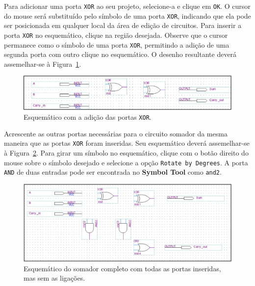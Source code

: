 \documentclass[12pt,a4paper]{article}
\begin{document}
Para adicionar uma porta \texttt{XOR} ao seu projeto, selecione-a e clique em \texttt{OK}. O cursor do mouse será substituído pelo símbolo de uma porta \texttt{XOR}, indicando que ela pode ser posicionada em qualquer local da área de edição de circuitos. Para inserir a porta \texttt{XOR} no esquemático, clique na região desejada. Observe que o cursor permanece como o símbolo de uma porta \texttt{XOR}, permitindo a adição de uma segunda porta com outro clique no esquemático. O desenho resultante deverá assemelhar-se à Figura~\ref{fig:xor}.

\begin{figure}[htbp!]
    \centering
    \includegraphics[width=\textwidth]{./figs/xor.png}
    \caption{Esquemático com a adição das portas \texttt{XOR}.}
    \label{fig:xor}
\end{figure}

Acrescente as outras portas necessárias para o circuito somador da mesma maneira que as portas \texttt{XOR} foram inseridas. Seu esquemático deverá assemelhar-se à Figura~\ref{fig:andxor}. Para girar um símbolo no esquemático, clique com o botão direito do mouse sobre o símbolo desejado e selecione a opção \texttt{Rotate by Degrees}. A porta \texttt{AND} de duas entradas pode ser encontrada no \textbf{Symbol Tool} como \texttt{and2}.

\begin{figure}[htbp!]
    \centering
    \includegraphics[width=\textwidth]{./figs/andxor.png}
    \caption{Esquemático do somador completo com todas as portas inseridas, mas sem as ligações.}
    \label{fig:andxor}
\end{figure}
\end{document}
